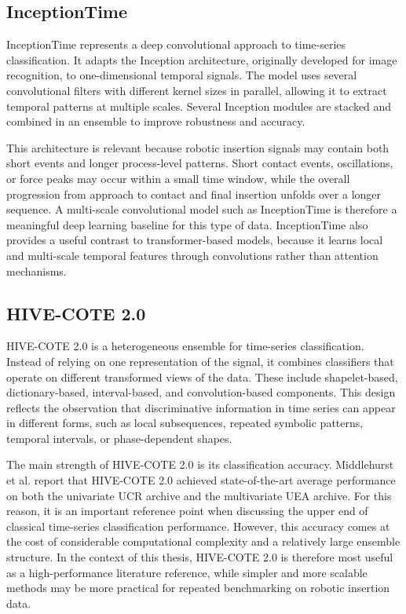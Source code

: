 \subsection{InceptionTime \cite{ismailfawazInceptionTimeFindingAlexNet2020}}

InceptionTime represents a deep convolutional approach to time-series classification. It adapts the Inception architecture, originally developed for image recognition, to one-dimensional temporal signals. The model uses several convolutional filters with different kernel sizes in parallel, allowing it to extract temporal patterns at multiple scales. Several Inception modules are stacked and combined in an ensemble to improve robustness and accuracy.

This architecture is relevant because robotic insertion signals may contain both short events and longer process-level patterns. Short contact events, oscillations, or force peaks may occur within a small time window, while the overall progression from approach to contact and final insertion unfolds over a longer sequence. A multi-scale convolutional model such as InceptionTime is therefore a meaningful deep learning baseline for this type of data. InceptionTime also provides a useful contrast to transformer-based models, because it learns local and multi-scale temporal features through convolutions rather than attention mechanisms.

\subsection{HIVE-COTE 2.0 \cite{middlehurstHIVECOTE20New2021}}

HIVE-COTE 2.0 is a heterogeneous ensemble for time-series classification. Instead of relying on one representation of the signal, it combines classifiers that operate on different transformed views of the data. These include shapelet-based, dictionary-based, interval-based, and convolution-based components. This design reflects the observation that discriminative information in time series can appear in different forms, such as local subsequences, repeated symbolic patterns, temporal intervals, or phase-dependent shapes.

The main strength of HIVE-COTE 2.0 is its classification accuracy. Middlehurst et al. report that HIVE-COTE 2.0 achieved state-of-the-art average performance on both the univariate UCR archive and the multivariate UEA archive. For this reason, it is an important reference point when discussing the upper end of classical time-series classification performance. However, this accuracy comes at the cost of considerable computational complexity and a relatively large ensemble structure. In the context of this thesis, HIVE-COTE 2.0 is therefore most useful as a high-performance literature reference, while simpler and more scalable methods may be more practical for repeated benchmarking on robotic insertion data.

